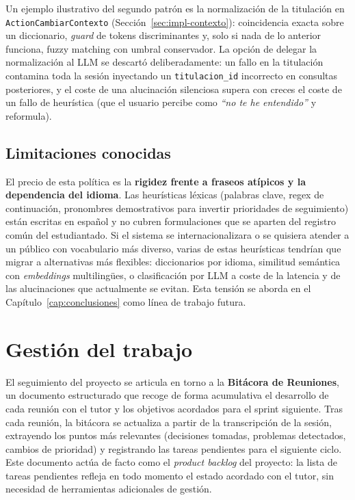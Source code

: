 Un ejemplo ilustrativo del segundo patrón es la normalización de la titulación en \texttt{ActionCambiarContexto} (Sección~\ref{sec:impl-contexto}): coincidencia exacta sobre un diccionario, \textit{guard} de tokens discriminantes y, solo si nada de lo anterior funciona, fuzzy matching con umbral conservador. La opción de delegar la normalización al LLM se descartó deliberadamente: un fallo en la titulación contamina toda la sesión inyectando un \texttt{titulacion\_id} incorrecto en consultas posteriores, y el coste de una alucinación silenciosa supera con creces el coste de un fallo de heurística (que el usuario percibe como \textit{``no te he entendido''} y reformula).

\subsection{Limitaciones conocidas}

El precio de esta política es la \textbf{rigidez frente a fraseos atípicos y la dependencia del idioma}. Las heurísticas léxicas (palabras clave, regex de continuación, pronombres demostrativos para invertir prioridades de seguimiento) están escritas en español y no cubren formulaciones que se aparten del registro común del estudiantado. Si el sistema se internacionalizara o se quisiera atender a un público con vocabulario más diverso, varias de estas heurísticas tendrían que migrar a alternativas más flexibles: diccionarios por idioma, similitud semántica con \textit{embeddings} multilingües, o clasificación por LLM a coste de la latencia y de las alucinaciones que actualmente se evitan. Esta tensión se aborda en el Capítulo~\ref{cap:conclusiones} como línea de trabajo futura.

\section{Gestión del trabajo}
\label{sec:gestion-trabajo}

El seguimiento del proyecto se articula en torno a la \textbf{Bitácora de Reuniones}, un documento estructurado que recoge de forma acumulativa el desarrollo de cada reunión con el tutor y los objetivos acordados para el sprint siguiente. Tras cada reunión, la bitácora se actualiza a partir de la transcripción de la sesión, extrayendo los puntos más relevantes (decisiones tomadas, problemas detectados, cambios de prioridad) y registrando las tareas pendientes para el siguiente ciclo. Este documento actúa de facto como el \textit{product backlog} del proyecto: la lista de tareas pendientes refleja en todo momento el estado acordado con el tutor, sin necesidad de herramientas adicionales de gestión.

